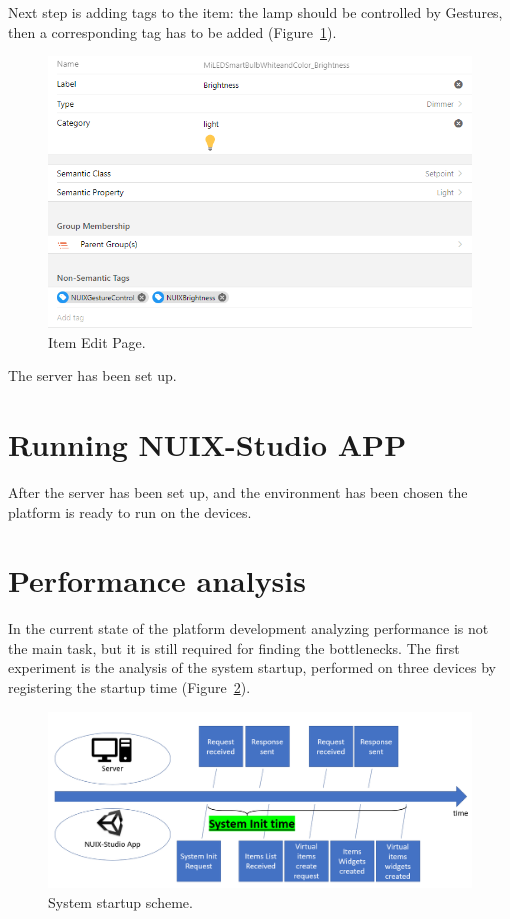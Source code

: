 Next step is adding tags to the item: the lamp should be controlled by Gestures, then a corresponding tag has to be added (Figure~\ref{fig:ItemEditPage-figure}).

\begin{figure}
  \centering
  \includegraphics[width=0.9\linewidth]{figures/ItemEditPage.png}
  \caption{Item Edit Page.}
  \label{fig:ItemEditPage-figure}
\end{figure}

The server has been set up.

\section{Running NUIX-Studio APP}

After the server has been set up, and the environment has been chosen the platform is ready to run on the devices.

\section{Performance analysis}

In the current state of the platform development analyzing performance is not the main task, but it is still required for finding the bottlenecks.
The first experiment is the analysis of the system startup, performed on three devices by registering the startup time (Figure~\ref{fig:SystemStartupScheme-figure}).

\begin{figure}
  \centering
  \includegraphics[width=0.9\linewidth]{figures/SystemStartupScheme.png}
  \caption{System startup scheme.}
  \label{fig:SystemStartupScheme-figure}
\end{figure}

